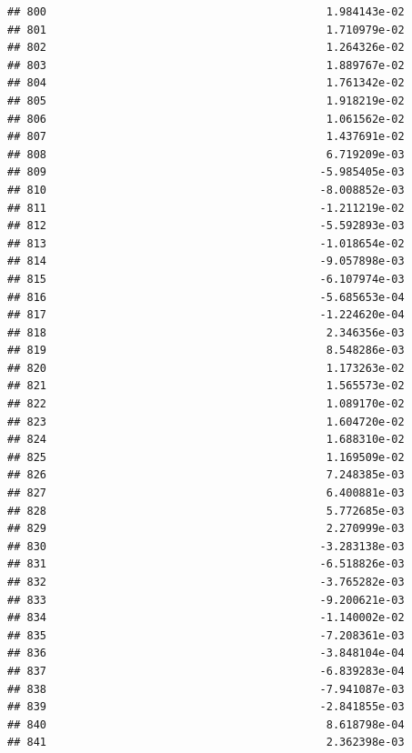 \documentclass[
]{article}
\begin{document}
\begin{verbatim}
## 800                                           1.984143e-02
## 801                                           1.710979e-02
## 802                                           1.264326e-02
## 803                                           1.889767e-02
## 804                                           1.761342e-02
## 805                                           1.918219e-02
## 806                                           1.061562e-02
## 807                                           1.437691e-02
## 808                                           6.719209e-03
## 809                                          -5.985405e-03
## 810                                          -8.008852e-03
## 811                                          -1.211219e-02
## 812                                          -5.592893e-03
## 813                                          -1.018654e-02
## 814                                          -9.057898e-03
## 815                                          -6.107974e-03
## 816                                          -5.685653e-04
## 817                                          -1.224620e-04
## 818                                           2.346356e-03
## 819                                           8.548286e-03
## 820                                           1.173263e-02
## 821                                           1.565573e-02
## 822                                           1.089170e-02
## 823                                           1.604720e-02
## 824                                           1.688310e-02
## 825                                           1.169509e-02
## 826                                           7.248385e-03
## 827                                           6.400881e-03
## 828                                           5.772685e-03
## 829                                           2.270999e-03
## 830                                          -3.283138e-03
## 831                                          -6.518826e-03
## 832                                          -3.765282e-03
## 833                                          -9.200621e-03
## 834                                          -1.140002e-02
## 835                                          -7.208361e-03
## 836                                          -3.848104e-04
## 837                                          -6.839283e-04
## 838                                          -7.941087e-03
## 839                                          -2.841855e-03
## 840                                           8.618798e-04
## 841                                           2.362398e-03

\end{verbatim}
\end{document}
